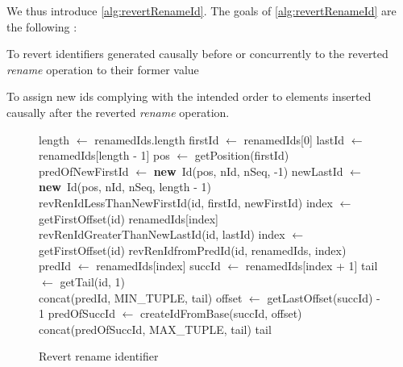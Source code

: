 \documentclass[10pt,journal,compsoc]{IEEEtran}
\let\MYoriglatexcaption\caption
\renewcommand{\caption}[2][\relax]{\MYoriglatexcaption[#2]{#2}}
\newcommand{\new}{\textbf{new}}
\begin{document}
We thus introduce \autoref{alg:revertRenameId}.
The goals of \autoref{alg:revertRenameId} are the following :
\begin{enumerate*}[label=(\roman*)]
    \item To revert identifiers generated causally before or concurrently to the reverted \emph{rename} operation to their former value
    \item To assign new ids complying with the intended order to elements inserted causally after the reverted \emph{rename} operation.
\end{enumerate*}

\begin{figure}
    \begin{algorithmic}
            \State length $\gets$ renamedIds.length
            \State firstId $\gets$ renamedIds[0]
            \State lastId $\gets$ renamedIds[length - 1]
            \State pos $\gets$ getPosition(firstId)
            \\
            \State predOfNewFirstId $\gets$ \new~Id(pos, nId, nSeq, -1)
            \State newLastId $\gets$ \new~Id(pos, nId, nSeq, length - 1)
            \\
                \State \Return revRenIdLessThanNewFirstId(id, firstId, newFirstId)
                \State index $\gets$ getFirstOffset(id)
                \State \Return renamedIds[index]
                \State \Return revRenIdGreaterThanNewLastId(id, lastId)
            \Else
                \State index $\gets$ getFirstOffset(id)
                \State \Return revRenIdfromPredId(id, renamedIds, index)
            \EndIf
        \EndFunction
        \\
            \State predId $\gets$ renamedIds[index]
            \State succId $\gets$ renamedIds[index + 1]
            \State tail $\gets$ getTail(id, 1)
            \\
                \State \Return concat(predId, MIN\_TUPLE, tail)
                \State offset $\gets$ getLastOffset(succId) - 1
                \State predOfSuccId $\gets$ createIdFromBase(succId, offset)
                \State \Return concat(predOfSuccId, MAX\_TUPLE, tail)
            \Else
                \State \Return tail
            \EndIf
        \EndFunction
    \end{algorithmic}
    \caption{Revert rename identifier}
    \label{alg:revertRenameId}
\end{figure}
\end{document}
